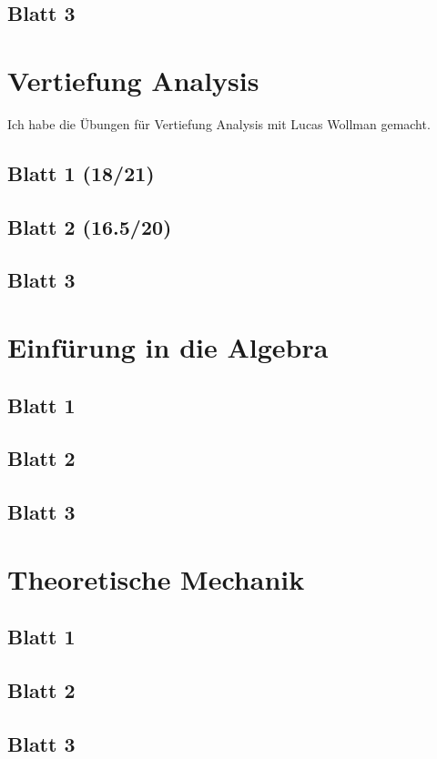 \documentclass{tuftebook}
\numberwithin{Theorem}{chapter}
\theoremstyle{definition}
\theoremstyle{definition}
\begin{document}
\section{Blatt 3}


\chapter{Vertiefung Analysis}
Ich habe die Übungen für Vertiefung Analysis mit Lucas Wollman gemacht.
\section{Blatt 1 (18/21)}

\section{Blatt 2 (16.5/20)}

\section{Blatt 3}


\chapter{Einf\"{u}rung in die Algebra}
\section{Blatt 1}

\section{Blatt 2}

\section{Blatt 3}


\chapter{Theoretische Mechanik}
\section{Blatt 1}

\section{Blatt 2}

\section{Blatt 3}

\end{document}
